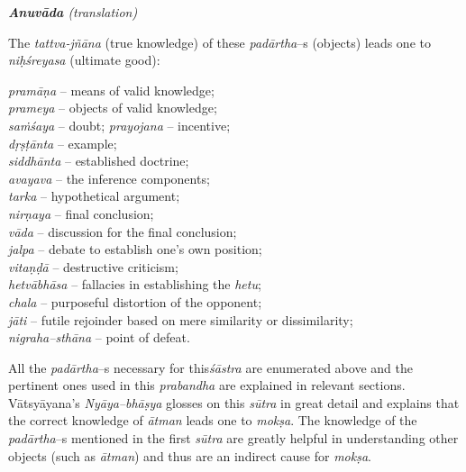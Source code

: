 \textit{\textbf{Anuvāda} (translation)}

The \textit{tattva-jñāna} (true knowledge) of these \textit{padārtha}–s (objects) leads one to \textit{niḥśreyasa} (ultimate good): 

\textit{pramāṇa} – means of valid knowledge;\\
 \textit{prameya} – objects of valid knowledge;\\
  \textit{saṁśaya} – doubt; \textit{prayojana} – incentive;\\
  \textit{dṛṣṭānta} – example;\\
   \textit{siddhānta} – established doctrine; \\
   \textit{avayava} – the inference components; \\
   \textit{tarka} – hypothetical argument;\\
    \textit{nirṇaya} – final conclusion; \\
    \textit{vāda} – discussion for the final conclusion;\\
     \textit{jalpa} – debate to establish one’s own position;\\
      \textit{vitaṇḍā} – destructive criticism;\\
       \textit{hetvābhāsa} – fallacies in establishing the \textit{hetu};\\
        \textit{chala} – purposeful distortion of the opponent; \\
        \textit{jāti} – futile rejoinder based on mere similarity or dissimilarity; \\
        \textit{nigraha–sthāna} – point of defeat.

All the \textit{padārtha}–s necessary for this\textit{śāstra} are enumerated above and the pertinent ones used in this \textit{prabandha} are explained in relevant sections. Vātsyāyana’s \textit{Nyāya–bhāṣya} glosses on this \textit{sūtra} in great detail and explains that the correct knowledge of \textit{ātman} leads one to \textit{mokṣa}. The knowledge of the \textit{padārtha}–s mentioned in the first \textit{sūtra} are greatly helpful in understanding other objects (such as \textit{ātman}) and thus are an indirect cause for \textit{mokṣa}.

